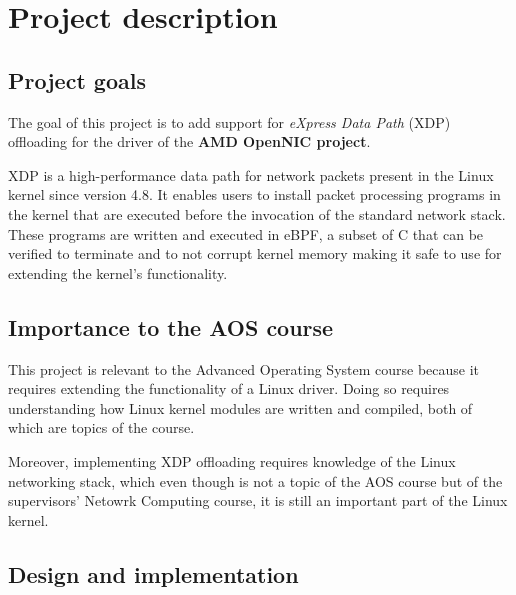 \documentclass[10pt,a4]{article}
\begin{document}
\section{Project description}

\subsection{Project goals}
The goal of this project is to add support for \textit{eXpress Data Path} (XDP)
offloading for the driver of the \textbf{AMD OpenNIC project}.

XDP is a high-performance data path for network packets present in the Linux
kernel since version 4.8. It enables users to install packet processing programs
in the kernel that are executed before the invocation of the standard network stack.
These programs are written and executed in eBPF, a subset of C that can be
verified to terminate and to not corrupt kernel memory making it safe to use for
extending the kernel's functionality.



\subsection{Importance to the AOS course}
This project is relevant to the Advanced Operating System course because it
requires extending the functionality of a Linux driver. Doing so requires
understanding how Linux kernel modules are written and compiled, both of which
are topics of the course.

Moreover, implementing XDP offloading requires knowledge of the Linux networking
stack, which even though is not a topic of the AOS course but of
the supervisors' Netowrk Computing course, it is still an important part of the
Linux kernel.



\subsection{Design and implementation}

\end{document}
